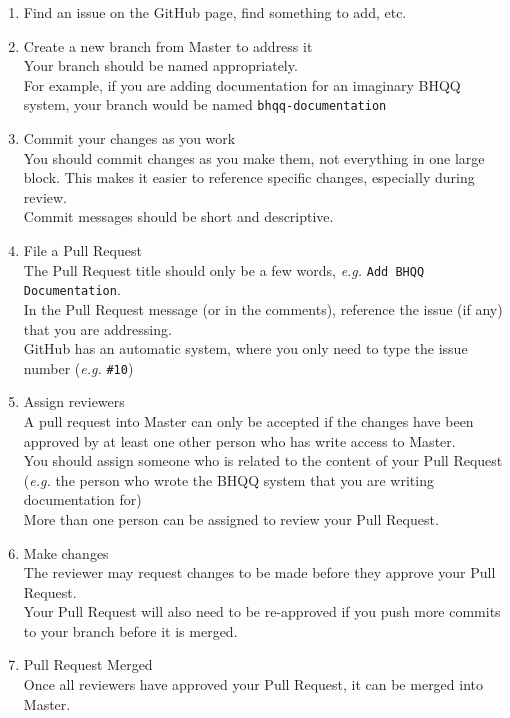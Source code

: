 \documentclass{article}
\begin{document}
\begin{enumerate}
	\item Find an issue on the GitHub page, find something to add, etc.
	\item Create a new branch from Master to address it
		\\ Your branch should be named appropriately.
		\\ For example, if you are adding documentation for an imaginary BHQQ system, your branch would be named \texttt{bhqq-documentation}
	\item Commit your changes as you work
		\\You should commit changes as you make them, not everything in one large block. This makes it easier to reference specific changes, especially during review.
		\\Commit messages should be short and descriptive.
	\item File a Pull Request
		\\The Pull Request title should only be a few words, \textit{e.g.} \texttt{Add BHQQ Documentation}.
		\\In the Pull Request message (or in the comments), reference the issue (if any) that you are addressing.
		\\GitHub has an automatic system, where you only need to type the issue number (\textit{e.g.} \texttt{\#10})
	\item Assign reviewers
		\\A pull request into Master can only be accepted if the changes have been approved by at least one other person who has write access to Master.
		\\You should assign someone who is related to the content of your Pull Request (\textit{e.g.} the person who wrote the BHQQ system that you are writing documentation for)
		\\More than one person can be assigned to review your Pull Request.
	\item Make changes
		\\The reviewer may request changes to be made before they approve your Pull Request.
		\\Your Pull Request will also need to be re-approved if you push more commits to your branch before it is merged.
	\item Pull Request Merged
		\\Once all reviewers have approved your Pull Request, it can be merged into Master.
\end{enumerate}
\end{document}
